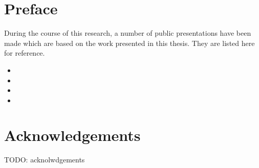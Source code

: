 \chapter*{Preface}
During the course of this research, a number of public presentations have been
 made which are based on the work presented in this thesis. They are listed
 here for reference.

\nobibliography*
\begin{itemize}
\item {}
\item {}
\item {}
\item {}
\end{itemize}


\chapter*{Acknowledgements} 

TODO: acknolwdgements

\singlespace
\cleardoublepage
\tableofcontents
\listoftables
\listofalgorithms
\listoffigures

\cleardoublepage
\onehalfspace
{}











\singlespace

\appendix




